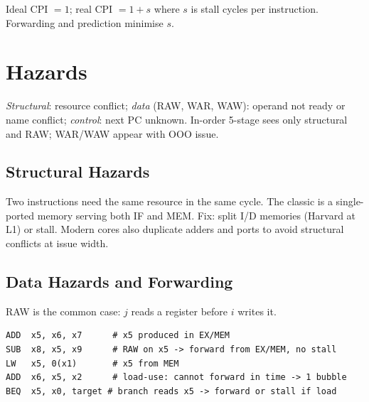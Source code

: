 Ideal CPI $=1$; real CPI $=1+s$ where $s$ is stall cycles per instruction. Forwarding and prediction minimise $s$.

\section{Hazards}
\begin{definition}
\textit{Structural}: resource conflict; \textit{data} (RAW, WAR, WAW): operand not ready or name conflict; \textit{control}: next PC unknown. In-order 5-stage sees only structural and RAW; WAR/WAW appear with OOO issue.
\end{definition}
\subsection{Structural Hazards}
Two instructions need the same resource in the same cycle. The classic is a single-ported memory serving both IF and MEM. Fix: split I/D memories (Harvard at L1) or stall. Modern cores also duplicate adders and ports to avoid structural conflicts at issue width.

\subsection{Data Hazards and Forwarding}
RAW is the common case: $j$ reads a register before $i$ writes it.

\begin{lstlisting}[language={[x86masm]Assembler}, caption={RAW hazards: forwarding vs.\ load-use stall}, label={lst:hazards}]
ADD  x5, x6, x7      # x5 produced in EX/MEM
SUB  x8, x5, x9      # RAW on x5 -> forward from EX/MEM, no stall
LW   x5, 0(x1)       # x5 from MEM
ADD  x6, x5, x2      # load-use: cannot forward in time -> 1 bubble
BEQ  x5, x0, target # branch reads x5 -> forward or stall if load
\end{lstlisting}

\begin{center}
\end{center}

